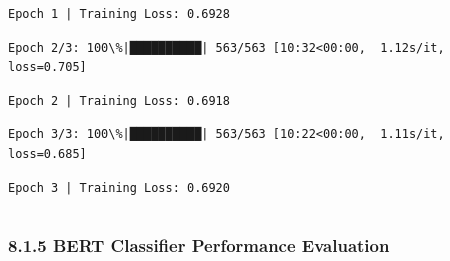 \documentclass[11pt]{article}
\begin{document}
    \begin{Verbatim}[commandchars=\\\{\}]
Epoch 1 | Training Loss: 0.6928
    \end{Verbatim}

    \begin{Verbatim}[commandchars=\\\{\}]
Epoch 2/3: 100\%|██████████| 563/563 [10:32<00:00,  1.12s/it, loss=0.705]
    \end{Verbatim}

    \begin{Verbatim}[commandchars=\\\{\}]
Epoch 2 | Training Loss: 0.6918
    \end{Verbatim}

    \begin{Verbatim}[commandchars=\\\{\}]
Epoch 3/3: 100\%|██████████| 563/563 [10:22<00:00,  1.11s/it, loss=0.685]
    \end{Verbatim}

    \begin{Verbatim}[commandchars=\\\{\}]
Epoch 3 | Training Loss: 0.6920
    \end{Verbatim}

    \begin{Verbatim}[commandchars=\\\{\}]

    \end{Verbatim}

    \subsubsection{8.1.5 BERT Classifier Performance
Evaluation}\label{bert-classifier-performance-evaluation}
\end{document}
